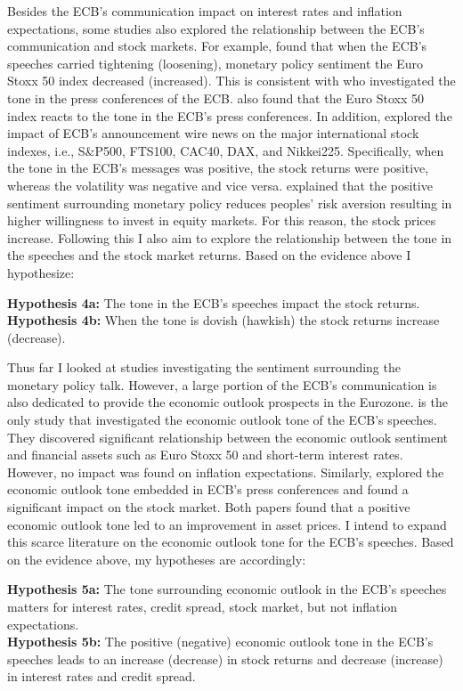 Besides the ECB’s communication impact on interest rates and inflation expectations, some studies also explored the relationship between the ECB’s communication and stock markets. For example, \textcite{ehrmann2007} found that when the ECB’s speeches carried tightening (loosening), monetary policy sentiment the Euro Stoxx 50 index decreased (increased). This is consistent with \textcite{schmeling2019} who investigated the tone in the press conferences of the ECB. \textcite{picault2017} also found that the Euro Stoxx 50 index reacts to the tone in the ECB’s press conferences. In addition, \textcite{apergis2019} explored the impact of ECB’s announcement wire news on the major international stock indexes, i.e., S\&P500, FTS100, CAC40, DAX, and Nikkei225. Specifically, when the tone in the ECB’s messages was positive, the stock returns were positive, whereas the volatility was negative and vice versa. \textcite{schmeling2019} explained that the positive sentiment surrounding monetary policy reduces peoples’ risk aversion resulting in higher willingness to invest in equity markets. For this reason, the stock prices increase. Following this I also aim to explore the relationship between the tone in the speeches and the stock market returns. Based on the evidence above I hypothesize:


\textbf{Hypothesis 4a:} The tone in the ECB’s speeches impact the stock returns.\\
\textbf{Hypothesis 4b:}  When the tone is  dovish (hawkish) the stock returns increase (decrease).

Thus far I looked at studies investigating the sentiment surrounding the monetary policy talk. However, a large portion of the ECB’s communication is also dedicated to provide the economic outlook prospects in the Eurozone. \textcite{ehrmann2007} is the only study that investigated the economic outlook tone of the ECB’s speeches. They discovered significant relationship between the economic outlook sentiment and financial assets such as Euro Stoxx 50 and short-term interest rates. However, no impact was found on inflation expectations. Similarly, \textcite{picault2017} explored the economic outlook tone embedded in ECB’s press conferences and found a significant impact on the stock market. Both papers found that a positive economic outlook tone led to an improvement in asset prices. I intend to expand this scarce literature on the economic outlook tone for the ECB’s speeches. Based on the evidence above, my hypotheses are accordingly:

\textbf{Hypothesis 5a:} The tone surrounding economic outlook in the ECB’s speeches matters for interest rates, credit spread, stock market, but not inflation expectations.\\
\textbf{Hypothesis 5b:} The positive (negative) economic outlook tone in the ECB’s speeches leads to an increase (decrease) in stock returns and decrease (increase) in interest rates and credit spread.



